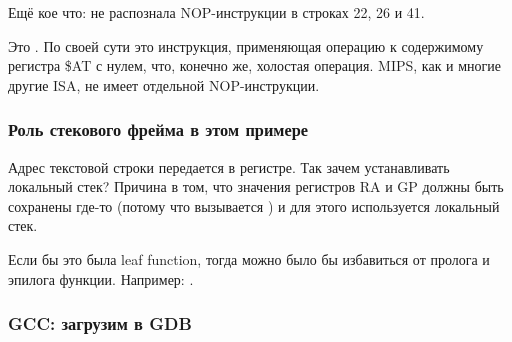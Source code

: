 Ещё кое что: \IDA не распознала \ac{NOP}-инструкции в строках 22, 26 и 41.

Это .
По своей сути это инструкция, применяющая операцию  к содержимому регистра \$AT с нулем,
что, конечно же, холостая операция.
MIPS, как и многие другие \ac{ISA}, не имеет отдельной \ac{NOP}-инструкции.

\subsubsection{Роль стекового фрейма в этом примере}

Адрес текстовой строки передается в регистре.
Так зачем устанавливать локальный стек?
Причина в том, что значения регистров \ac{RA} и GP должны быть сохранены где-то
(потому что вызывается \printf) и для этого используется локальный стек.

Если бы это была \gls{leaf function}, тогда можно было бы избавиться от пролога и эпилога функции. Например:
 .

\subsubsection{\Optimizing GCC: загрузим в GDB}



